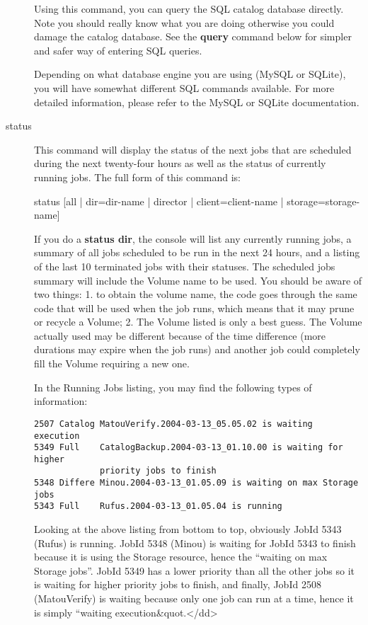\begin{description}
Using this command, you can query the SQL catalog database  directly. Note you
should really know what you are doing otherwise  you could damage the catalog
database. See the {\bf query} command below  for simpler and safer way of
entering SQL queries.  

Depending on what database engine you are using (MySQL or SQLite),  you will
have somewhat different SQL commands available. For more  detailed
information, please refer to the MySQL or SQLite documentation.  

\item [status]
   This command will display the status of the next  jobs that are scheduled
during the next twenty-four hours as  well as the status of currently running
jobs. The full form  of this command is:  

status [all | dir=\lt{}dir-name\gt{} | director | 
client=\lt{}client-name\gt{} | storage=\lt{}storage-name\gt{}]  

If you do a {\bf status dir}, the console will list  any currently running
jobs, a summary of all  jobs scheduled to be run in the next 24 hours, and  a
listing of the last 10 terminated jobs with their  statuses. The scheduled
jobs summary  will include the Volume name to be used. You should be aware  of
two things: 1. to obtain the volume name, the code  goes through the same code
that will be used when the  job runs, which means that it may prune or recycle
a Volume;  2. The Volume listed is only a best guess. The Volume  actually
used may be different because of the time  difference (more durations may
expire when the job  runs) and another job could completely fill the Volume 
requiring a new one.  

In the Running Jobs listing, you may find the following  types of information:


\footnotesize
\begin{verbatim}
2507 Catalog MatouVerify.2004-03-13_05.05.02 is waiting execution
5349 Full    CatalogBackup.2004-03-13_01.10.00 is waiting for higher
             priority jobs to finish
5348 Differe Minou.2004-03-13_01.05.09 is waiting on max Storage jobs
5343 Full    Rufus.2004-03-13_01.05.04 is running
\end{verbatim}
\normalsize

Looking at the above listing from bottom to top,  obviously JobId 5343 (Rufus)
is running. JobId 5348  (Minou) is waiting for JobId 5343 to finish because it
is using the  Storage resource, hence the ``waiting on max Storage jobs''.
JobId  5349 has a lower priority than all the other jobs so it is waiting for 
higher priority jobs to finish, and finally, JobId 2508 (MatouVerify)  is
waiting because only one job can run at a time, hence it is simply  ``waiting
execution\&quot.</dd>  


\end{description}
